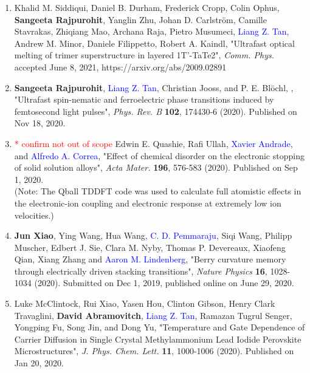 \begin{enumerate}
    \item Khalid M. Siddiqui, Daniel B. Durham, Frederick Cropp, Colin Ophus, {\bf Sangeeta Rajpurohit}, Yanglin Zhu, Johan D. Carlström, Camille Stavrakas, Zhiqiang Mao, Archana Raja, Pietro Musumeci, \textcolor{blue}{Liang Z. Tan}, Andrew M. Minor, Daniele Filippetto, Robert A. Kaindl, "Ultrafast optical melting of trimer superstructure in layered 1T'-TaTe2", {\it Comm. Phys.} accepted June 8, 2021, https://arxiv.org/abs/2009.02891 

    \item  {\bf Sangeeta Rajpurohit}, \textcolor{blue}{Liang Z. Tan},  Christian Jooss, and P. E. Bl\"ochl, , "Ultrafast spin-nematic and ferroelectric phase transitions induced by femtosecond light pulses", {\it Phys. Rev. B} {\bf 102}, 174430-6 (2020). Published on Nov 18, 2020.

    \item \textcolor{red}{* confirm not out of scope} Edwin E. Quashie, Rafi Ullah, \textcolor{blue}{Xavier Andrade}, and \textcolor{blue}{Alfredo A. Correa}, "Effect of chemical disorder on the electronic stopping of solid solution alloys", {\it Acta Mater.} {\bf 196}, 576-583 (2020). Published on Sep 1, 2020.\\
    (Note: The Qball TDDFT code was used to calculate full atomistic effects in the electronic-ion coupling and electronic response at extremely low ion velocities.)
        

    \item {\bf Jun Xiao}, Ying Wang, Hua Wang, \textcolor{blue}{C. D. Pemmaraju}, Siqi Wang, Philipp Muscher, Edbert J. Sie, Clara M. Nyby, Thomas P. Devereaux, Xiaofeng Qian, Xiang Zhang and \textcolor{blue}{Aaron M. Lindenberg}, "Berry curvature memory through electrically driven stacking transitions", {\it Nature Physics} {\bf 16}, 1028-1034 (2020). Submitted on Dec 1, 2019, published online on June 29, 2020.

    \item  Luke McClintock, Rui Xiao, Yasen Hou, Clinton Gibson, Henry Clark Travaglini, {\bf David Abramovitch}, \textcolor{blue}{Liang Z. Tan}, Ramazan Tugrul Senger, Yongping Fu, Song Jin, and Dong Yu, "Temperature and Gate Dependence of Carrier Diffusion in Single Crystal Methylammonium Lead Iodide Perovskite Microstructures", {\it J. Phys. Chem. Lett.} {\bf 11}, 1000-1006 (2020). Published on Jan 20, 2020.

\end{enumerate}

\clearpage
